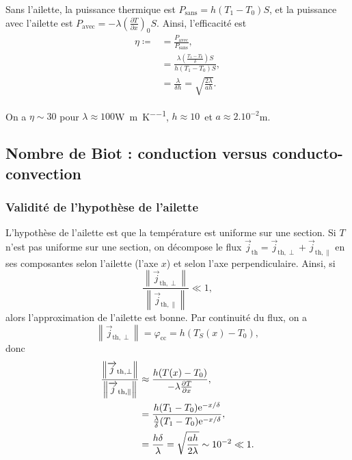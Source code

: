             Sans l'ailette, la puissance thermique est $P_{\text{sans}}=h(T_1-T_0)S$, et la puissance avec l'ailette est $P_{\text{avec}}=-\lambda\left(\frac{\partial T}{\partial x}\right)_{0}S$. Ainsi, l'efficacité est 
            \begin{align}
                \eta\coloneqq
                &=
                \frac{P_{\text{avec}}}{P_{\text{sans}}},\\
                &=
                \frac{\lambda\left(\frac{T_1-T_0}{\delta}\right)S}{h(T_1-T_0)S},\\
                &=
                \frac{\lambda}{\delta h}=\sqrt{\frac{2\lambda}{ah}}.
            \end{align}

            On a $\eta\sim 30$ pour $\lambda\approx100$\si[]{\watt\per\metre\per\kelvin}, $h\approx10$\si[]{\watt\per\metre\square} et $a\approx2.10^{-2}$\si[]{\metre}.

    \subsection[Nombre de Biot]{Nombre de Biot : conduction versus conducto-convection}
        \subsubsection{Validité de l'hypothèse de l'ailette}
            L'hypothèse de l'ailette est que la température est uniforme sur une section. Si $T$ n'est pas uniforme sur une section, on décompose le flux $\vec{j}_{\text{th}}=\vec{j}_{\text{th},\perp}+\vec{j}_{\text{th},\parallel}$ en ses composantes selon l'ailette (l'axe $x$) et selon l'axe perpendiculaire. Ainsi, si 
            \begin{equation}
                \frac{\left\lVert\vec{j}_{\text{th},\perp}\right\rVert}{\left\lVert\vec{j}_{\text{th},\parallel}\right\rVert}\ll1,
            \end{equation}
            alors l'approximation de l'ailette est bonne. Par continuité du flux, on a 
            \begin{equation}
                \left\lVert\vec{j}_{\text{th},\perp}\right\rVert=\varphi_{\text{cc}}=h(T_S(x)-T_0),
            \end{equation}
            donc
            \begin{align}
                \frac{\left\lVert\protect\overrightarrow{{j}}_{\text{th},\perp}\right\rVert}{\left\lVert\protect\overrightarrow{{j}}_{\text{th},\parallel}\right\rVert}
                &\approx
                \frac{h(T(x)-T_0)}{-\lambda\frac{\partial T}{\partial x}},\\
                &=
                \frac{h(T_1-T_0)\mathrm{e}^{-x/\delta}}{\frac{\lambda}{\delta}(T_1-T_0)\mathrm{e}^{-x/\delta}},\\
                &=
                \frac{h\delta}{\lambda}=\sqrt{\frac{ah}{2\lambda}}\sim10^{-2}\ll1.
            \end{align}


